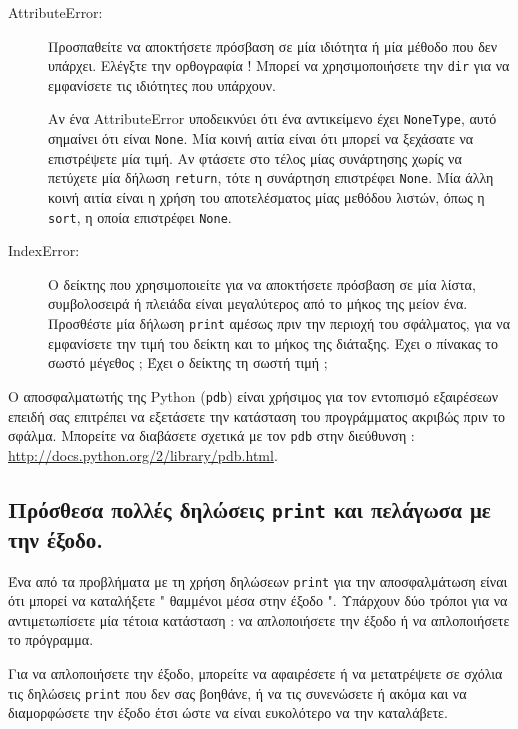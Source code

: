\documentclass[10pt]{book}
\begin{document}
\begin{description}
\item[AttributeError:]  Προσπαθείτε να αποκτήσετε πρόσβαση σε μία ιδιότητα ή μία μέθοδο που δεν υπάρχει.  Ελέγξτε την ορθογραφία !   Μπορεί να χρησιμοποιήσετε την  {\tt dir}  για να εμφανίσετε τις ιδιότητες που υπάρχουν.

Αν ένα  AttributeError  υποδεικνύει ότι ένα αντικείμενο έχει  {\tt NoneType},  αυτό σημαίνει ότι είναι  {\tt None}.   Μία κοινή αιτία είναι ότι μπορεί να ξεχάσατε να επιστρέψετε μία τιμή. Αν φτάσετε στο τέλος μίας συνάρτησης χωρίς να πετύχετε μία δήλωση  {\tt return},  τότε η συνάρτηση επιστρέφει  {\tt None}.   Μία άλλη κοινή αιτία είναι η χρήση του αποτελέσματος μίας μεθόδου λιστών, όπως η  {\tt sort},  η οποία επιστρέφει 
 {\tt None}.

\item[IndexError:]  Ο δείκτης που χρησιμοποιείτε για να αποκτήσετε πρόσβαση σε 
μία λίστα, συμβολοσειρά ή πλειάδα είναι μεγαλύτερος από το μήκος της μείον ένα.  
Προσθέστε μία δήλωση  {\tt print}  αμέσως πριν την περιοχή του σφάλματος, για να εμφανίσετε την τιμή του δείκτη και το μήκος της διάταξης.  Έχει ο πίνακας το σωστό μέγεθος ;  Έχει ο δείκτης τη σωστή τιμή ;

\end{description}

 Ο αποσφαλματωτής της  Python ({\tt pdb})  είναι χρήσιμος για τον εντοπισμό 
εξαιρέσεων επειδή σας επιτρέπει να εξετάσετε την κατάσταση του προγράμματος ακριβώς πριν το σφάλμα.  Μπορείτε να διαβάσετε σχετικά με τον  {\tt pdb}  στην διεύθυνση : \url{http://docs.python.org/2/library/pdb.html}. 


\subsection{Πρόσθεσα πολλές δηλώσεις  {\tt print}  και πελάγωσα με την έξοδο.}

Ένα από τα προβλήματα με τη χρήση δηλώσεων  {\tt print}  για την αποσφαλμάτωση είναι ότι μπορεί να καταλήξετε  " θαμμένοι μέσα στην έξοδο ".   Υπάρχουν δύο τρόποι για να αντιμετωπίσετε μία τέτοια κατάσταση :  να απλοποιήσετε την έξοδο ή να απλοποιήσετε το πρόγραμμα.

Για να απλοποιήσετε την έξοδο, μπορείτε να αφαιρέσετε ή να μετατρέψετε σε σχόλια τις δηλώσεις  {\tt print}  που δεν σας βοηθάνε, ή να τις συνενώσετε ή ακόμα και να διαμορφώσετε την έξοδο έτσι ώστε να είναι ευκολότερο να την καταλάβετε.
\end{document}
